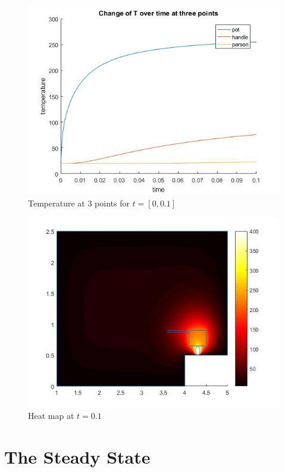 \documentclass[12pt]{article}  %
\begin{document}
\begin{figure}[H]
	\includegraphics[scale=.75]{3pointplot}
	\caption{Temperature at 3 points for $t=[0,0.1]$}
	\label{3point}
\end{figure}
\begin{figure}[H]
	\includegraphics[scale=.75]{heatmap}
	\caption{Heat map at $t=0.1$}
	\label{heatmap}
\end{figure}
\section{The Steady State}
\end{document}
